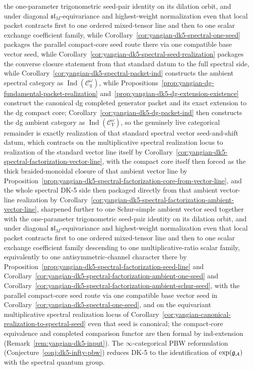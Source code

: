 \begin{enumerate}[label=\textup{(\roman*)}]
  the one-parameter trigonometric seed-pair identity on its dilation
  orbit, and under diagonal \(\mathfrak{sl}_M\)-equivariance and
  highest-weight normalization even that local packet contracts first
  to one ordered mixed-tensor line and then to one scalar exchange
  coefficient family,
  while Corollary~\ref{cor:yangian-dk5-spectral-one-seed}
  packages the parallel compact-core seed route there via one
  compatible base vector seed,
  while
  Corollary~\ref{cor:yangian-dk5-spectral-seed-realization}
  packages the converse closure statement from that standard datum to
  the full spectral side, while
  Corollary~\ref{cor:yangian-dk5-spectral-packet-ind} constructs the
  ambient spectral category as
  \(\operatorname{Ind}(\mathcal{C}_q^\omega)\), while
  Propositions~\ref{prop:yangian-dg-fundamental-packet-realization}
  and~\ref{prop:yangian-dk5-dg-extension-existence} construct the
  canonical dg completed generator packet and its exact extension to
  the dg compact core; Corollary~\ref{cor:yangian-dk5-dg-packet-ind}
  then constructs the dg ambient category as
  \(\operatorname{Ind}(\mathcal{C}_Y^\omega)\), so the genuinely live
  categorical remainder is exactly realization of that standard
  spectral vector seed-and-shift datum, which contracts on the
  multiplicative spectral realization locus to realization of the
  standard vector line itself by
  Corollary~\ref{cor:yangian-dk5-spectral-factorization-vector-line},
  with the compact core itself then forced as the thick
  braided-monoidal closure of that ambient vector line by
  Proposition~\ref{prop:yangian-dk5-spectral-factorization-core-from-vector-line},
  and the whole spectral DK-5 side then packaged directly from that
  ambient vector-line realization by
  Corollary~\ref{cor:yangian-dk5-spectral-factorization-ambient-vector-line},
  sharpened further to one Schur-simple ambient vector seed together
  with the one-parameter trigonometric seed-pair identity on its
  dilation orbit, and under diagonal \(\mathfrak{sl}_M\)-equivariance
  and highest-weight normalization even that local packet contracts
  first to one ordered mixed-tensor line and then to one scalar
  exchange coefficient family descending to one multiplicative-ratio
  scalar family, equivalently to one antisymmetric-channel character
  there
  by
  Proposition~\ref{prop:yangian-dk5-spectral-factorization-seed-line}
  and
  Corollary~\ref{cor:yangian-dk5-spectral-factorization-ambient-one-seed}
  and
  Corollary~\ref{cor:yangian-dk5-spectral-factorization-ambient-schur-seed},
  with the parallel compact-core seed route via one compatible base
  vector seed in Corollary~\ref{cor:yangian-dk5-spectral-one-seed}, and
  on the equivariant multiplicative spectral realization locus of
  Corollary~\ref{cor:yangian-canonical-realization-to-spectral-seed}
  even that seed is canonical;
  the compact-core equivalence and completed comparison functor are
  then formal by ind-extension
  \textup{(}Remark~\ref{rem:yangian-dk5-input}\textup{)}.
  The $\infty$-categorical PBW reformulation
  (Conjecture~\ref{conj:dk5-infty-pbw}) reduces DK-5 to the
  identification of $\exp(\mathfrak{g}_{\mathcal{A}})$ with the spectral
  quantum group.
\end{enumerate}

